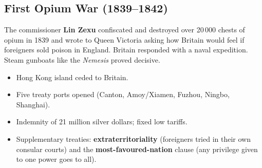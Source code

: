 \begin{center}
\end{center}

\subsection{First Opium War (1839--1842)}

The commissioner \textbf{Lin Zexu} confiscated and destroyed over 20\,000 chests of opium in
1839 and wrote to Queen Victoria asking how Britain would feel if foreigners sold poison
in England. Britain responded with a naval expedition. Steam gunboats like the
\emph{Nemesis} proved decisive.

\begin{important}
\begin{itemize}
  \item Hong Kong island ceded to Britain.
  \item Five treaty ports opened (Canton, Amoy/Xiamen, Fuzhou, Ningbo, Shanghai).
  \item Indemnity of 21 million silver dollars; fixed low tariffs.
  \item Supplementary treaties: \textbf{extraterritoriality} (foreigners tried in their own
        consular courts) and the \textbf{most-favoured-nation} clause (any privilege given
        to one power goes to all).
\end{itemize}
\end{important}

